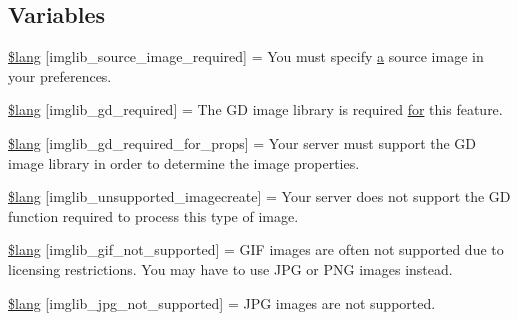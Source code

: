 \subsection*{Variables}
\begin{DoxyCompactItemize}
\item 
\hyperlink{_admin_2system_2language_2english_2imglib__lang_8php_af48787ab142f633036ebdf1cc5da7409}{\$lang} \mbox{[}\textquotesingle{}imglib\+\_\+source\+\_\+image\+\_\+required\textquotesingle{}\mbox{]} = \textquotesingle{}You must specify \hyperlink{_admin_2assets_2js_2bootstrap_8min_8js_a1f5870dcf487187f13d5fd328ed9e6e7}{a} source image in your preferences.\textquotesingle{}
\item 
\hyperlink{_admin_2system_2language_2english_2imglib__lang_8php_aa8d7f8276e62fbe759daef2021c16552}{\$lang} \mbox{[}\textquotesingle{}imglib\+\_\+gd\+\_\+required\textquotesingle{}\mbox{]} = \textquotesingle{}The G\+D image library is required \hyperlink{confirm__transfer_8php_aaf007b9fa5c90d7c5a7011bece9cfc15}{for} this feature.\textquotesingle{}
\item 
\hyperlink{_admin_2system_2language_2english_2imglib__lang_8php_a0da9c99f9e2b5f38ccbefb9d9f702c5e}{\$lang} \mbox{[}\textquotesingle{}imglib\+\_\+gd\+\_\+required\+\_\+for\+\_\+props\textquotesingle{}\mbox{]} = \textquotesingle{}Your server must support the G\+D image library in order to determine the image properties.\textquotesingle{}
\item 
\hyperlink{_admin_2system_2language_2english_2imglib__lang_8php_ace032cbe8dafb1f3417a758d0914ecdb}{\$lang} \mbox{[}\textquotesingle{}imglib\+\_\+unsupported\+\_\+imagecreate\textquotesingle{}\mbox{]} = \textquotesingle{}Your server does not support the G\+D function required to process this type of image.\textquotesingle{}
\item 
\hyperlink{_admin_2system_2language_2english_2imglib__lang_8php_a235a59a6660145fc136b3933b5b10675}{\$lang} \mbox{[}\textquotesingle{}imglib\+\_\+gif\+\_\+not\+\_\+supported\textquotesingle{}\mbox{]} = \textquotesingle{}G\+I\+F images are often not supported due to licensing restrictions. You may have to use J\+P\+G or P\+N\+G images instead.\textquotesingle{}
\item 
\hyperlink{_admin_2system_2language_2english_2imglib__lang_8php_a4acdc927c172bab1370b2897c667c552}{\$lang} \mbox{[}\textquotesingle{}imglib\+\_\+jpg\+\_\+not\+\_\+supported\textquotesingle{}\mbox{]} = \textquotesingle{}J\+P\+G images are not supported.\textquotesingle{}
\item 

\end{DoxyCompactItemize}
